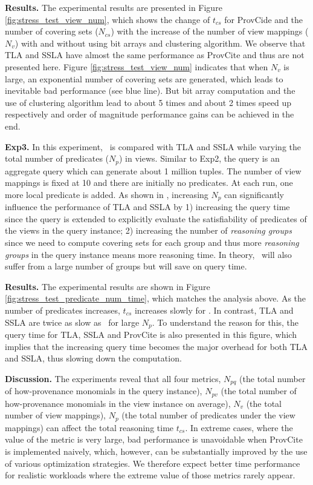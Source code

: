\textbf{Results.}
The experimental results are presented in Figure \ref{fig:stress_test_view_num}, which shows the change of $t_{cs}$ for ProvCide and the number of covering sets ($N_{cs}$) with the increase of the number of view mappings ($N_v$) with and without using bit arrays and clustering algorithm. We observe that TLA and SSLA have almost the same performance as ProvCite and thus are not presented here. Figure \ref{fig:stress_test_view_num} indicates that when $N_v$ is large, an exponential number of covering sets are generated, which leads to inevitable bad performance (see blue line). But bit array computation and the use of clustering algorithm lead to about 5 times and about 2 times speed up respectively and order of magnitude performance gains can be achieved in the end.


\textbf{Exp3.} In this experiment, \provalg\ is compared with TLA and SSLA while varying the total number of predicates ($N_p$) in views. Similar to Exp2, the query is an aggregate query which can generate about 1 million tuples. The number of view mappings is fixed at 10 and there are initially no predicates. At each run, one more local predicate is added. As shown in \cite{wu2018data}, increasing $N_p$ can significantly influence the performance of TLA and SSLA by 1) increasing the query time since the query is extended to explicitly evaluate the satisfiability of predicates of the views in the query instance; 2) increasing the number of {\em reasoning groups} since we need to compute covering sets for each group and thus more {\em reasoning groups} in the query instance means more reasoning time. In theory, \provalg\ will also suffer from a large number of groups but will save on query time.

\textbf{Results.} The experimental results are shown in Figure \ref{fig:stress_test_predicate_num_time}, which matches the analysis above. As the number of predicates increases, $t_{cs}$ 
increases slowly for \provalg. In contrast, TLA and SSLA are twice as slow as \provalg\ for large $N_p$. To understand the reason for this, the query time for TLA, SSLA and ProvCite is also presented in this figure, which implies that the increasing query time becomes the major overhead for both TLA and SSLA, thus slowing down the computation.

{\bf Discussion.} The experiments reveal that all four metrics, $N_{pq}$ (the total number of how-provenance monomials in the query instance), $N_{pv}$ (the total number of how-provenance monomials in the view instance on average), $N_v$ (the total number of view mappings), $N_p$ (the total number of predicates under the view mappings) can affect the total reasoning time $t_{cs}$. In extreme cases, where the value of the metric is very large, bad performance is unavoidable when ProvCite is implemented naively, which, however, can be substantially improved by the use of various optimization strategies. We therefore expect better time performance for realistic workloads where the extreme value of those metrics rarely appear. 

